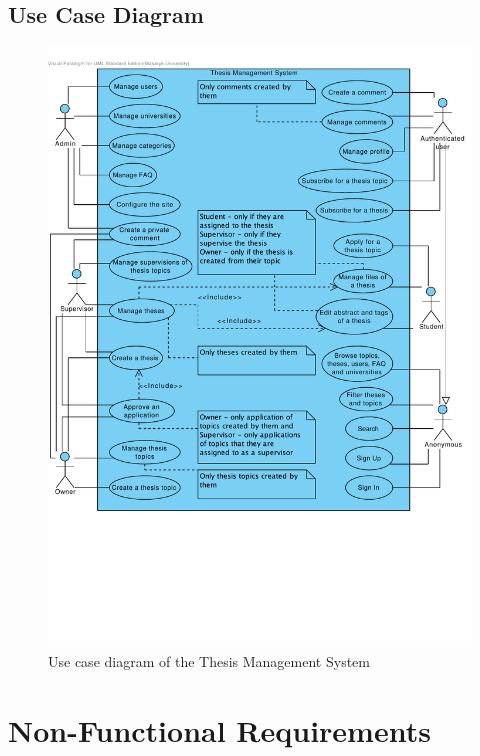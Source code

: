\subsection{Use Case Diagram}

\begin{figure}[H]
    \centering
        \includegraphics[trim=0 190 10 30, clip, keepaspectratio, width=\textwidth]{./images/use-case.pdf}
    \caption{Use case diagram of the Thesis Management System}
    \label{fig:use-case}
\end{figure}

\section{Non-Functional Requirements}


